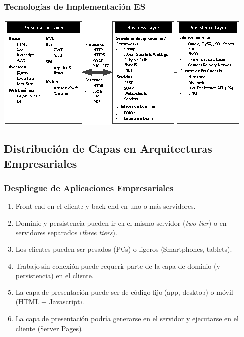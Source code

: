 \documentclass[a4paper,slidestop,xcolor=pst,dvips,blue]{beamer}
\begin{document}
\begin{frame}[c]
	\frametitle{Tecnologías de Implementación ES}
	\begin{center}
        \includegraphics[width=\linewidth,keepaspectratio=true]{images/enterpriseLayers/technologies.eps}
	\end{center}
\end{frame}

\subsection{Distribución de Capas en Arquitecturas Empresariales}

\begin{frame}[c]
	\frametitle{Despliegue de Aplicaciones Empresariales}
	\begin{enumerate}[<+->]
        \item Front-end en el cliente y back-end en uno o más servidores.
        \item Dominio y persistencia pueden ir en el mismo servidor (\emph{two tier}) o en servidores separados (\emph{three tiers}).
        \item Los clientes pueden ser pesados (PCs) o ligeros (Smartphones, tablets).
        \item Trabajo sin conexión puede requerir parte de la capa de dominio (y persistencia) en el cliente.
        \item La capa de presentación puede ser de código fijo (app, desktop) o móvil (HTML + Javascript).
        \item La capa de presentación podría generarse en el servidor y ejecutarse en el cliente (Server Pages).
	\end{enumerate}
\end{frame}
\end{document}
